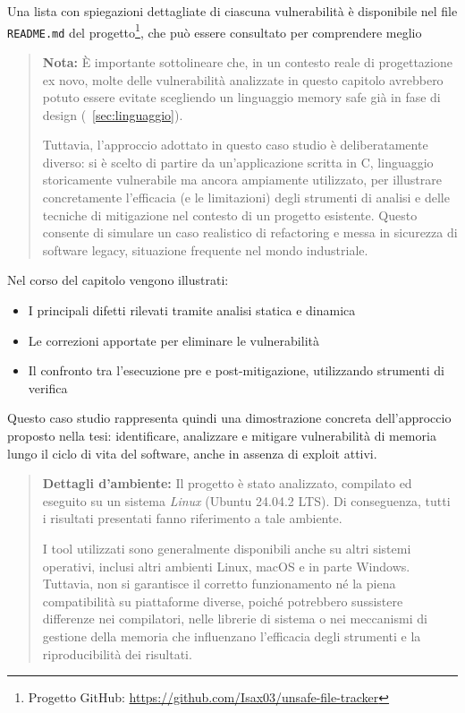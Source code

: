 Una lista con spiegazioni dettagliate di ciascuna vulnerabilità è disponibile nel
file \texttt{README.md} del progetto\footnote{Progetto GitHub: \url{https://github.com/Isax03/unsafe-file-tracker}},
che può essere consultato per comprendere meglio

\begin{quote}
  \textbf{Nota:} È importante sottolineare che, in un contesto reale di progettazione
  ex novo, molte delle vulnerabilità analizzate in questo capitolo avrebbero
  potuto essere evitate scegliendo un linguaggio memory safe già in fase di
  design (~\autoref{sec:linguaggio}).

  Tuttavia, l'approccio adottato in questo caso studio è deliberatamente diverso:
  si è scelto di partire da un'applicazione scritta in C, linguaggio
  storicamente vulnerabile ma ancora ampiamente utilizzato, per illustrare concretamente
  l'efficacia (e le limitazioni) degli strumenti di analisi e delle tecniche di mitigazione
  nel contesto di un progetto esistente. Questo consente di simulare un caso
  realistico di refactoring e messa in sicurezza di software legacy, situazione frequente
  nel mondo industriale.
\end{quote}

Nel corso del capitolo vengono illustrati:
\begin{itemize}
  \item I principali difetti rilevati tramite analisi statica e dinamica

  \item Le correzioni apportate per eliminare le vulnerabilità

  \item Il confronto tra l'esecuzione pre e post-mitigazione, utilizzando
    strumenti di verifica
\end{itemize}

Questo caso studio rappresenta quindi una dimostrazione concreta dell'approccio
proposto nella tesi: identificare, analizzare e mitigare vulnerabilità di
memoria lungo il ciclo di vita del software, anche in assenza di exploit attivi.

\begin{quote}
  \textbf{Dettagli d'ambiente:} Il progetto è stato analizzato, compilato ed eseguito
  su un sistema \textit{Linux} (Ubuntu 24.04.2 LTS). Di conseguenza, tutti i risultati
  presentati fanno riferimento a tale ambiente.

  I tool utilizzati sono generalmente disponibili anche su altri sistemi operativi,
  inclusi altri ambienti Linux, macOS e in parte Windows. Tuttavia, non si garantisce
  il corretto funzionamento né la piena compatibilità su piattaforme diverse,
  poiché potrebbero sussistere differenze nei compilatori, nelle librerie di sistema
  o nei meccanismi di gestione della memoria che influenzano l'efficacia degli strumenti
  e la riproducibilità dei risultati.
\end{quote}



